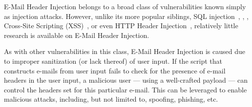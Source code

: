 E-Mail Header Injection belongs to a broad class of vulnerabilities known simply as injection attacks. However, unlike its more popular siblings, SQL injection~\cite{sql1}, \cite{sql0}, \cite{sql2}, Cross-Site Scripting (XSS)~\cite{Injection1}, \cite{KleinAmit} or even HTTP Header Injection~\cite{sessionride}, relatively little research is available on E-Mail Header Injection.

As with other vulnerabilities in this class, E-Mail Header Injection is caused due to improper sanitization (or lack thereof) of user input. If the script that constructs e-mails from user input fails to check for the presence of e-mail headers in the user input, a malicious user --- using a well-crafted payload --- can control the headers set for this particular e-mail. This can be leveraged to enable malicious attacks, including, but not limited to, spoofing, phishing, etc.